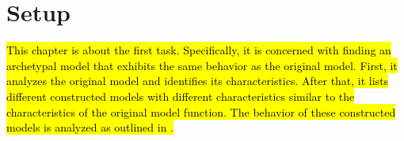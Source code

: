 \chapter{Setup}
\label{chap:setup}

\hl{
	This chapter is about the first task.
	Specifically, it is concerned with finding an archetypal model that exhibits the same behavior as the original model.
	First, it analyzes the original model and identifies its characteristics.
	After that, it lists different constructed models with different characteristics similar to the characteristics of the original model function.
	The behavior of these constructed models is analyzed as outlined in .
}






